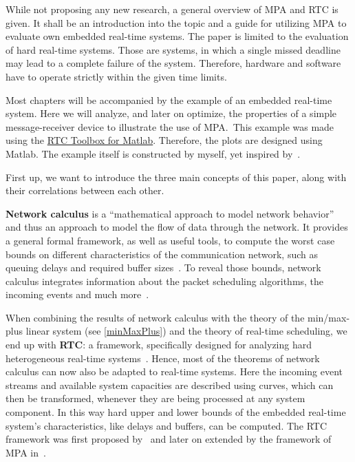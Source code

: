 While not proposing any new research, a general overview of MPA and RTC is given.
It shall be an introduction into the topic and a guide for utilizing MPA to evaluate own embedded real-time systems.
The paper is limited to the evaluation of hard real-time systems.
Those are systems, in which a single missed deadline may lead to a complete failure of the system.
Therefore, hardware and software have to operate strictly within the given time limits.

Most chapters will be accompanied by the example of an embedded real-time system. Here we will analyze, and later on optimize, the properties of a simple message-receiver device to illustrate the use of MPA.\
This example was made using the \href{https://www.mpa.ethz.ch/}{RTC Toolbox for Matlab}.
Therefore, the plots are designed using Matlab.
The example itself is constructed by myself, yet inspired by~\cite{ver}.


First up, we want to introduce the three main concepts of this paper, along with their correlations between each other.

\textbf{Network calculus} is a ``mathematical approach to model network behavior''~\cite{thi:00} and thus an approach to model the flow of data through the network. 
It provides a general formal framework, as well as useful tools, to compute the worst case bounds on different characteristics of the communication network,
such as queuing delays and required buffer sizes~\cite{sof:12/2}.
To reveal those bounds, network calculus integrates information about the packet scheduling algorithms, the incoming events and much more~\cite{thi:00}.

When combining the results of network calculus with the theory of the min/max-plus linear system (see \autoref{minMaxPlus}) and the theory of real-time scheduling, we end up with \textbf{RTC}:
a framework, specifically designed for analyzing hard heterogeneous real-time systems~\cite{thi:00}.
Hence, most of the theorems of network calculus can now also be adapted to real-time systems.
Here the incoming event streams and available system capacities are described using curves,
which can then be transformed, whenever they are being processed at any system component.
In this way hard upper and lower bounds of the embedded real-time system's characteristics, like delays and buffers, can be computed.
The RTC framework was first proposed by~\cite{thi:00} and later on extended by the framework of MPA in~\cite{cha}.

